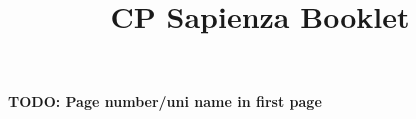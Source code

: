 \documentclass[9pt, a4paper, notitlepage]{extreport}
\title{CP Sapienza Booklet}
\newcommand{\todo}[1]{\begin{shaded}\textbf{TODO: #1}\end{shaded}}
\begin{document}
\begin{multicols*}{3}

\todo{Page number/uni name in first page}

\tableofcontents











\end{multicols*}
\end{document}
